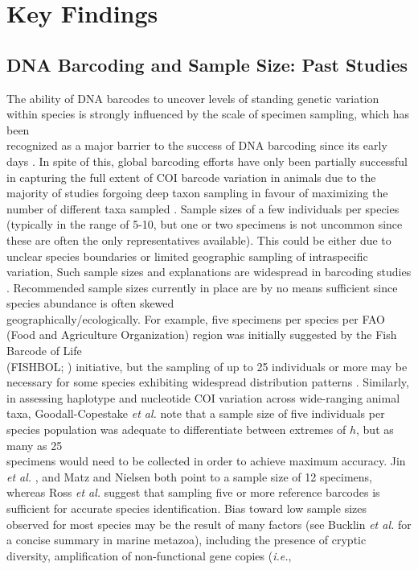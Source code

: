 \vspace{5mm}

\section{Key Findings}

\subsection{DNA Barcoding and Sample Size: Past Studies}

The ability of DNA barcodes to uncover levels of standing genetic variation within species is strongly influenced by the scale of specimen sampling, which has been \\ recognized as a major barrier to the success of DNA barcoding since its early days  \cite{hebert2004identification, meyer2005dna, ward2005dna}. In spite of this, global barcoding efforts have only been partially successful in capturing the full extent of COI barcode variation in animals due to the majority of studies forgoing deep taxon sampling in favour of maximizing the number of different taxa sampled \cite{matz2005likelihood, zhang2010estimating}. Sample sizes of a few individuals per species (typically in the range of 5-10, but one or two specimens is not uncommon since these are often the only representatives available). This could be either due to unclear species boundaries  or limited geographic sampling of intraspecific variation, Such sample sizes and explanations are widespread in barcoding studies \cite{hajibabaei2007dna, matz2005likelihood, zhang2010estimating}. Recommended sample sizes currently in place are by no means sufficient since species abundance is often skewed \\ geographically/ecologically. For example, five specimens per species per FAO (Food and Agriculture Organization) region was initially suggested by the Fish Barcode of Life \\ (FISHBOL; \cite{ward2009campaign}) initiative, but the sampling of up to 25 individuals or more may be necessary for some species exhibiting widespread distribution patterns \cite{becker2011five, steinke2011fish}. Similarly, in assessing haplotype and nucleotide COI variation across wide-ranging animal taxa, Goodall-Copestake \textit{et al.} \cite{goodall2012comparison} note that a sample size of five individuals per species population was adequate to differentiate between extremes of $h$, but as many as 25 \\ specimens would need to be collected in order to achieve maximum accuracy. Jin \textit{et al.} \cite{jin2012simple}, and Matz and Nielsen \cite{matz2005likelihood} both point to a sample size of 12 specimens, whereas Ross \textit{et al.} \cite{ross2008testing} suggest that sampling five or more reference barcodes is sufficient for accurate species identification. Bias toward low sample sizes observed for most species may be the result of many factors (see Bucklin \textit{et al.} \cite{bucklin2011dna} for a concise summary in marine metazoa), including the presence of cryptic diversity, amplification of non-functional gene copies (\textit{i.e.}, 